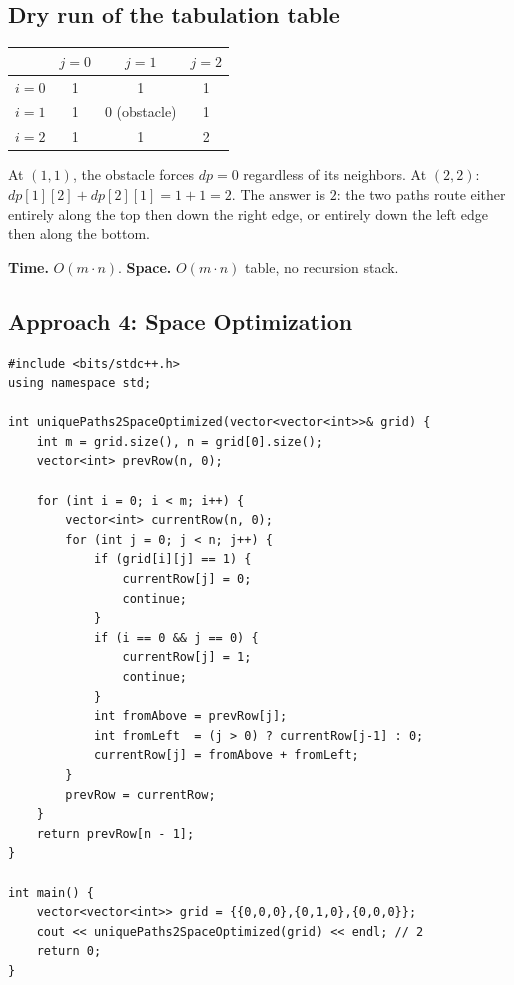 \subsection*{Dry run of the tabulation table}


\begin{center}
\begin{tabular}{c|c|c|c}
 & $j=0$ & $j=1$ & $j=2$ \\ \hline
$i=0$ & 1 & 1 & 1 \\ \hline
$i=1$ & 1 & 0 (obstacle) & 1 \\ \hline
$i=2$ & 1 & 1 & 2
\end{tabular}
\end{center}

At $(1,1)$, the obstacle forces $\textit{dp}=0$ regardless of its
neighbors. At $(2,2)$: $\textit{dp}[1][2]+\textit{dp}[2][1] = 1+1=2$.
The answer is $2$: the two paths route either entirely along the top
then down the right edge, or entirely down the left edge then along the
bottom.

\begin{complexitybox}
\textbf{Time.} $O(m \cdot n)$.
\textbf{Space.} $O(m \cdot n)$ table, no recursion stack.
\end{complexitybox}

\subsection*{Approach 4: Space Optimization}

\begin{lstlisting}
#include <bits/stdc++.h>
using namespace std;

int uniquePaths2SpaceOptimized(vector<vector<int>>& grid) {
    int m = grid.size(), n = grid[0].size();
    vector<int> prevRow(n, 0);

    for (int i = 0; i < m; i++) {
        vector<int> currentRow(n, 0);
        for (int j = 0; j < n; j++) {
            if (grid[i][j] == 1) {
                currentRow[j] = 0;
                continue;
            }
            if (i == 0 && j == 0) {
                currentRow[j] = 1;
                continue;
            }
            int fromAbove = prevRow[j];
            int fromLeft  = (j > 0) ? currentRow[j-1] : 0;
            currentRow[j] = fromAbove + fromLeft;
        }
        prevRow = currentRow;
    }
    return prevRow[n - 1];
}

int main() {
    vector<vector<int>> grid = {{0,0,0},{0,1,0},{0,0,0}};
    cout << uniquePaths2SpaceOptimized(grid) << endl; // 2
    return 0;
}
\end{lstlisting}

